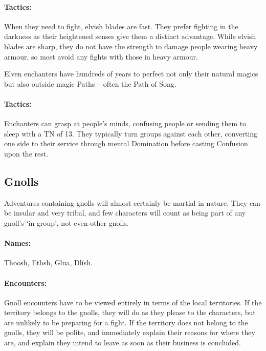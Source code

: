 \begin{multicols}{2}
\paragraph{Tactics:} When they need to fight, elvish blades are fast.
They prefer fighting in the darkness as their heightened senses give them a distinct advantage.
While elvish blades are sharp, they do not have the strength to damage people wearing heavy armour, so most avoid any fights with those in heavy armour.

\label{elven_enchanter}

Elven enchanters have hundreds of years to perfect not only their natural magics but also outside magic Paths -- often the Path of Song.


\paragraph{Tactics:} Enchanters can grasp at people's minds, confusing people or sending them to sleep with a TN of 13.
They typically turn groups against each other, converting one side to their service through mental Domination before casting Confusion upon the rest.

\subsection{Gnolls}


Adventures containing gnolls will almost certainly be martial in nature.  They can be insular and very tribal, and few characters will count as being part of any gnoll's `in-group', not even other gnolls.

\paragraph{Names:} Thoosh, Ethsh, Glua, Dl\'{i}sh.


\paragraph{Encounters:} Gnoll encounters have to be viewed entirely in terms of the local territories.
If the territory belongs to the gnolls, they will do as they please to the characters, but are unlikely to be preparing for a fight.
If the territory does not belong to the gnolls, they will be polite, and immediately explain their reasons for where they are, and explain they intend to leave as soon as their business is concluded.

\end{multicols}
